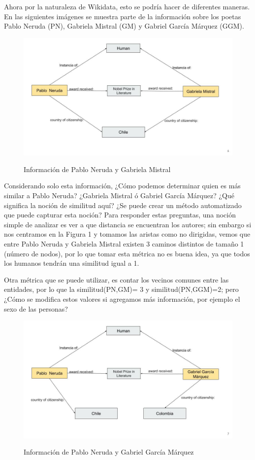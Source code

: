 Ahora por la naturaleza de Wikidata, esto se podría hacer de diferentes maneras. En las siguientes  imágenes  se muestra parte de la información sobre los poetas Pablo Neruda (PN), Gabriela Mistral (GM) y Gabriel García Márquez (GGM).

\begin{figure}[ht]
\centering
\includegraphics[scale=0.3]{Imagen1.jpg}
\label{fig:Imagen1 }
\caption{Información de Pablo Neruda y Gabriela Mistral}
\end{figure}


\newpage

Considerando solo esta información, ¿Cómo podemos determinar quien es más similar a Pablo Neruda? ¿Gabriela Mistral ó Gabriel García Márquez? ¿Qué significa la noción de similitud aquí? ¿Se puede crear un método automatizado que puede capturar esta noción?   Para responder estas preguntas, una noción simple de analizar es ver a que distancia se encuentran los autores; sin embargo si nos centramos en la Figura 1 y tomamos las aristas como no dirigidas, vemos que  entre Pablo Neruda y Gabriela Mistral existen 3 caminos distintos de tamaño 1 (número de nodos), por lo que tomar esta métrica no es buena idea, ya que todos los humanos tendrán una similitud igual a 1.


Otra métrica que se puede utilizar, es  contar los vecinos comunes entre las entidades, por lo que la  similitud(PN,GM)= 3 y similitud(PN,GGM)=2; pero  ¿Cómo se modifica estos valores si agregamos más información, por ejemplo el sexo de las personas?

\begin{figure}[ht]
\centering
\includegraphics[scale=0.3]{Imagen2.jpg}
\label{fig:Imagen2 }
\caption{Información de Pablo Neruda y Gabriel García Márquez}
\end{figure}

